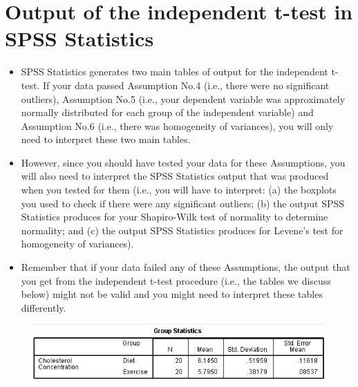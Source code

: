 \documentclass[]{article}
\begin{document}
\section{Output of the independent t-test in SPSS Statistics}
\begin{itemize}
	\item SPSS Statistics generates two main tables of output for the independent t-test. If your data passed Assumption No.4 (i.e., there were no significant outliers), Assumption No.5 (i.e., your dependent variable was approximately normally distributed for each group of the independent variable) and Assumption No.6 (i.e., there was homogeneity of variances), you will only need to interpret these two main tables. 
	
\item However, since you should have tested your data for these Assumptions, you will also need to interpret the SPSS Statistics output that was produced when you tested for them (i.e., you will have to interpret: (a) the boxplots you used to check if there were any significant outliers; (b) the output SPSS Statistics produces for your Shapiro-Wilk test of normality to determine normality; and (c) the output SPSS Statistics produces for Levene's test for homogeneity of variances). 


\item Remember that if your data failed any of these Assumptions, the output that you get from the independent t-test procedure (i.e., the tables we discuss below) might not be valid and you might need to interpret these tables differently.
	
\end{itemize}
	
	
\begin{figure}[h!]
\centering
\includegraphics[width=0.7\linewidth]{TwoSample/TwoSampleOutpu1}

\label{fig:TwoSampleOutpu1}
\end{figure}
\end{document}
